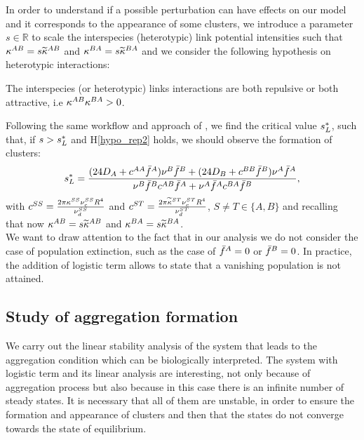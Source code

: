 In order to understand if a possible perturbation can have effects on our model and it corresponds to the appearance of some clusters,
 we introduce a parameter $s \in \mathbb{R}$ to scale the interspecies (heterotypic) link potential intensities such that ${\kappa^{AB}}=s {\widetilde{\kappa}^{AB}} $ and ${\kappa^{BA}}=s {\widetilde{\kappa}^{BA}} $ and we consider the following hypothesis on heterotypic interactions:
\begin{hypo}\label{hypo_rep2}
 The interspecies (or heterotypic) links interactions are both repulsive or both attractive, i.e ${\kappa^{AB}}{\kappa^{BA}}>0$. 
\end{hypo}
Following the same workflow  and approach of \cite{twoparticule}, we find the critical value ${s^{*}_{L}}$, such that, if $s> {s^{*}_{L}}$ and H\ref{hypo_rep2} holds, we should observe the formation of clusters:
\begin{equation}
{s^{*}_{L}}=\frac{(24 D_A+{c^{AA}}{\bar{f}^A}){\nu^B}{\bar{f}^B}+(24 D_B+{c^{BB}}{\bar{f}^B}){\nu^A}{\bar{f}^A}}{{\nu^B}{\bar{f}^B}{c^{AB}}{\bar{f}^A}+{\nu^A}{\bar{f}^A}{c^{BA}}{\bar{f}^B}},
\end{equation}
with ${c^{SS}}=\frac{2\pi {\kappa^{SS}} {\nu_c^{SS}} R^{4}}{{\nu_d^{SS}}}$ and ${c^{ST}}=\frac{2\pi {\widetilde{\kappa}^{ST}} {\nu_c^{ST}} R^{4}}{{\nu_d^{ST}}}$, $S\neq T \in \{ A,B \}$ and recalling that now ${\kappa^{AB}}=s {\widetilde{\kappa}^{AB}} $ and ${\kappa^{BA}}=s {\widetilde{\kappa}^{BA}} $. \\
We want to draw attention to the fact that in our analysis we do not consider the case of population extinction, such as the case of ${\bar{f}^A}=0$ or ${\bar{f}^B}=0$. In practice, the addition of logistic term allows to state that a vanishing population is not attained. 

\subsection{Study of aggregation formation}
We carry out the linear stability analysis of the system that leads to the aggregation condition which can be biologically interpreted. The system with logistic term and its linear analysis are interesting, not only because of aggregation process but also because in this case there is an infinite number of steady states.  It is necessary that all of them  are unstable, in order to ensure the formation and appearance of clusters and then that the states do not converge towards the state of equilibrium.

